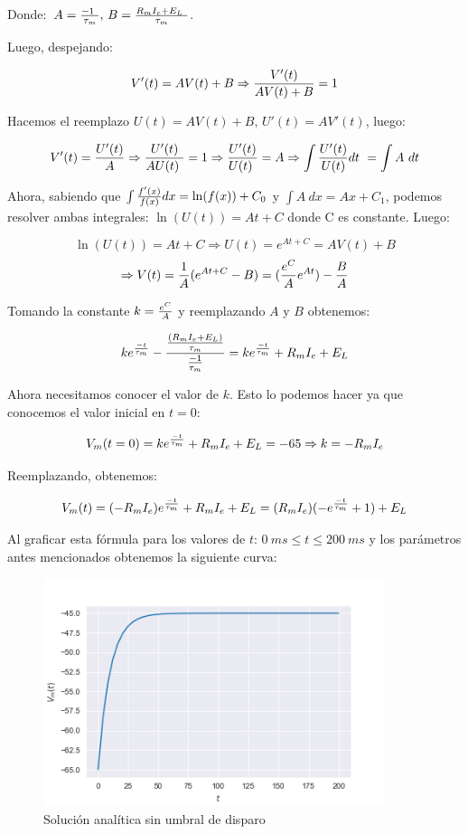 \documentclass [a4paper,12pt,oneside,final]{article}
\begin{document}
Donde: $ \, A = { {- 1} \over \tau_m }, \, B = { {R_m I_e + E_L} \over \tau_m } $.


\pagebreak
Luego, despejando:

\[ V'(t) = A V(t) + B  \Rightarrow { V'(t) \over {A V(t) + B} } = 1 \]

Hacemos el reemplazo $ U(t) = A V(t) + B $, $ U'(t) = A V'(t) $, luego:

\[ V'(t) = { U'(t) \over A } \Rightarrow { U'(t) \over A U(t) } = 1 \Rightarrow { U'(t) \over U(t) } = A \Rightarrow { \int {U'(t) \over U(t)} dt } = \int { A \  dt }\]

Ahora, sabiendo que $ \int { {f'(x) \over f(x)} dx } = \ln (f(x)) + C_0  $ y $ \int A \ dx = Ax + C_1 $, podemos resolver ambas integrales: $ \ln (U(t)) = A t + C $ donde C es constante. Luego:

\[ \ln (U(t)) = A t + C  \Rightarrow U(t) = e^{A t + C} = A V(t) + B \]
\[ \Rightarrow V(t) = {1 \over A} ( e^{At + C} - B ) = ({ e^C \over A }e^{At}) - { B \over A } \]

Tomando la constante $ k = { e^C \over A } $ y reemplazando $ A $ y $ B $ obtenemos:

\[ k e^{-t \over \tau_m } - { {( R_m I_e + E_L ) \over \tau_m } \over {-1 \over \tau_m } } = k e^{-t \over \tau_m } + R_m I_e + E_L \]

Ahora necesitamos conocer el valor de $ k $. Esto lo podemos hacer ya que conocemos el valor inicial en $ t = 0 $:

\[ V_m(t = 0) = k e^{ -t \over \tau_m } + R_m I_e + E_L = -65 \Rightarrow k = - R_m I_e \]

Reemplazando, obtenemos:

\[ V_m(t) = (- R_m I_e) e^{-t \over \tau_m} + R_m I_e + E_L = (R_m I_e) (- e^{-t \over \tau_m} + 1) + E_L \]

Al graficar esta fórmula para los valores de $t$: $ 0 \ ms \leq t \leq 200 \ ms $ y los parámetros antes mencionados obtenemos la siguiente curva:

\begin{figure}[ht]
  \centering
  \includegraphics[width=10cm,keepaspectratio]{./diagramas/grafico_a.png}
  \caption{Solución analítica sin umbral de disparo}
\end{figure}
\end{document}
